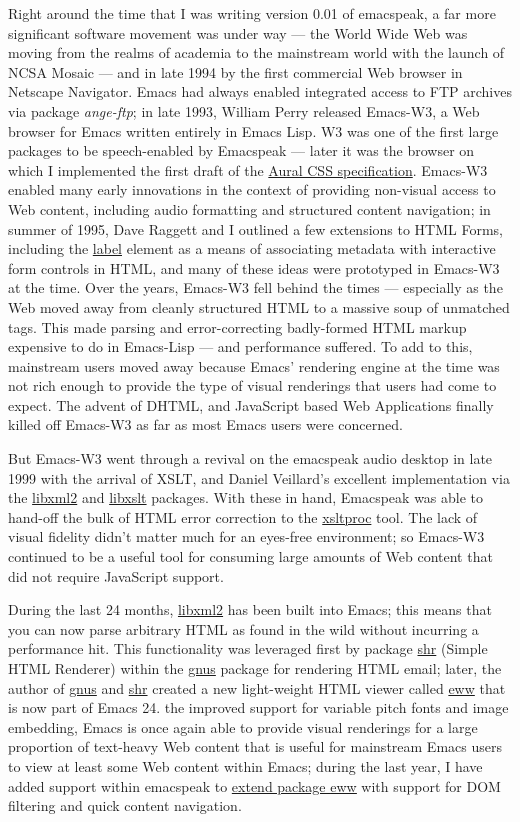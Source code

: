 \documentclass[11pt]{article}
\begin{document}
Right around the time that I was writing version 0.01 of
emacspeak, a far more significant software movement was under way
— the World Wide Web was moving from the realms of academia to
the mainstream world with the launch of NCSA Mosaic — and in late
1994 by the first commercial Web browser in Netscape
Navigator. Emacs had always enabled integrated access to FTP
archives via package \emph{ange-ftp}; in late 1993, William Perry
released Emacs-W3, a Web browser for Emacs written entirely in
Emacs Lisp. W3 was one of the first large packages to be
speech-enabled by Emacspeak — later it was the browser on which I
implemented the first draft of the
\href{http://www.w3.org/TR/CSS2/aural.html}{Aural CSS
specification}. Emacs-W3 enabled many early innovations in the
context of providing non-visual access to Web content, including
audio formatting and structured content navigation; in summer of
1995, Dave Raggett and I outlined a few extensions to HTML Forms,
including the \uline{label} element as a means of associating metadata
with interactive form controls in HTML, and many of these ideas
were prototyped in Emacs-W3 at the time. Over the years, Emacs-W3
fell behind the times — especially as the Web moved away from
cleanly structured HTML to a massive soup of unmatched tags. This
made parsing and error-correcting badly-formed HTML markup
expensive to do in Emacs-Lisp — and performance suffered. To add
to this, mainstream users moved away because Emacs' rendering
engine at the time was not rich enough to provide the type of
visual renderings that users had come to expect. The advent of
DHTML, and JavaScript based Web Applications finally killed off
Emacs-W3 as far as most Emacs users were concerned.

But Emacs-W3 went through a revival on the emacspeak audio
desktop in late 1999 with the arrival of XSLT, and Daniel
Veillard's excellent implementation via the \uline{libxml2} and
\uline{libxslt} packages. With these in hand, Emacspeak was able to
hand-off the bulk of HTML error correction to the \uline{xsltproc}
tool. The lack of visual fidelity didn't matter much for an
eyes-free environment; so Emacs-W3 continued to be a useful tool
for consuming large amounts of Web content that did not require
JavaScript support.

During the last 24 months, \uline{libxml2} has been built into Emacs;
this means that you can now parse arbitrary HTML as found in the
wild without incurring a performance hit. This functionality was
leveraged first by package \uline{shr} (Simple HTML Renderer) within
the \uline{gnus} package for rendering HTML email; later, the author of
\uline{gnus} and \uline{shr} created a new light-weight HTML viewer called
\uline{eww} that is now part of Emacs 24. the improved support for
variable pitch fonts and image embedding, Emacs is once again
able to provide visual renderings for a large proportion of
text-heavy Web content that is useful for mainstream Emacs users
to view at least some Web content within Emacs; during the last
year, I have added support within emacspeak to
\href{http://emacspeak.blogspot.com/2014/05/emacspeak-eww-updates-for-complete.html}{extend
package \uline{eww}} with support for DOM filtering and quick content
navigation.
\end{document}
